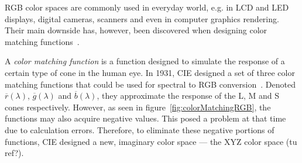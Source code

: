 RGB color spaces are commonly used in everyday world, e.g. in LCD and LED displays, digital cameras, scanners and even in computer graphics rendering. Their main downside has, however, been discovered when designing color matching functions~\cite{colorMatchingDerivation}.

A \emph{color matching function} is a function designed to simulate the response of a certain type of cone in the human eye. In 1931, CIE designed a set of three color matching functions that could be used for spectral to RGB conversion~\cite{colorMatchingDerivation}. Denoted $\overline{r}(\lambda)$, $\overline{g}(\lambda)$ and $\overline{b}(\lambda)$, they approximate the response of the L, M and S cones respectively. However, as seen in figure~\cref{fig:colorMatchingRGB}, the functions may also acquire negative values. This posed a problem at that time due to calculation errors. Therefore, to eliminate these negative portions of functions, CIE designed a new, imaginary color space --- the XYZ color space (tu ref?).

